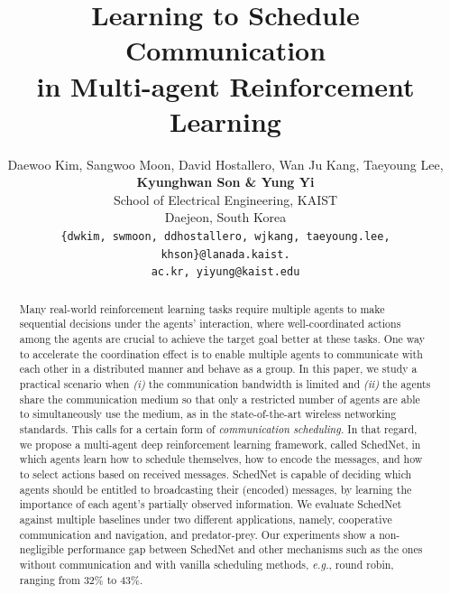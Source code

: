 \documentclass{article} %
\title{Learning to Schedule Communication \\ in Multi-agent Reinforcement Learning}
\author{Daewoo Kim, Sangwoo Moon, David Hostallero, Wan Ju Kang, Taeyoung Lee, \\ {\bf Kyunghwan Son \& Yung Yi} \\
School of Electrical Engineering, KAIST\\
Daejeon, South Korea\\
\texttt{\small \{dwkim, swmoon, ddhostallero, wjkang, taeyoung.lee, khson\}@lanada.kaist.}\\ \texttt{\small ac.kr, yiyung@kaist.edu} \\
}
\newcommand{\sched}{SchedNet}
\begin{document}

\maketitle

%
\begin{abstract}
  Many real-world reinforcement learning tasks require multiple agents
  to make sequential decisions under the agents' interaction, where
  well-coordinated actions among the agents are crucial to achieve the
  target goal better at these tasks. One way to accelerate the
  coordination effect is to enable multiple agents to communicate with
  each other in a distributed manner and behave as a group.
  In this paper, we study a practical scenario when {\em (i)} the
  communication bandwidth is limited and {\em (ii)} the agents share the
  communication medium so that only a restricted number of agents are
  able to simultaneously use the medium, as in the state-of-the-art wireless networking standards.  
  This calls for a certain
  form of {\em communication scheduling.}  In that regard, we propose a
  multi-agent deep reinforcement learning framework, called {\sched},
  in which agents learn how to schedule themselves, how to encode the
  messages, and how to select actions based on received
  messages. {\sched} is capable of deciding which agents should be
  entitled to broadcasting their (encoded) messages, by learning the
  importance of each agent's partially observed information.  We
  evaluate {\sched} against multiple baselines under two different
  applications, namely, cooperative communication and navigation, and
  predator-prey. Our experiments show a non-negligible performance gap
  between {\sched} and other mechanisms such as the ones without
  communication and with vanilla scheduling methods, {\em e.g.}, round
  robin, ranging from 32\% to 43\%.
\end{abstract}

% 
\end{document}
